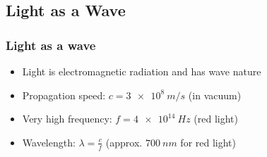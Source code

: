 \subsection{Light as a Wave}%
\label{sub:light_as_a_wave}


\begin{frame}
    \frametitle{Light as a wave}


    \begin{itemize}
        \item Light is electromagnetic radiation and has wave nature
        \item Propagation speed: $c=\SI{3e8}{m/s}$ (in vacuum)
        \item Very high frequency: $f=\SI{4e14}{Hz}$ (red light)
        \item Wavelength: $\lambda = \frac{c}{f}$ (approx. $\SI{700}{nm}$ for red light)
    \end{itemize}

    \begin{figure}
        \centering{}
        \scalebox{0.9}{}
    \end{figure}

\end{frame}


